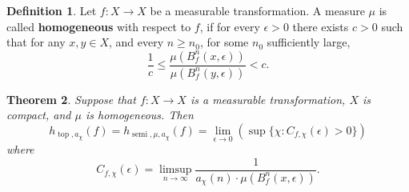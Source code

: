 \documentclass[oneside]{amsart}
\theoremstyle{plain}
\newtheorem{THM}{Theorem}[section]
\theoremstyle{definition}
\newtheorem{DEF}[THM]{Definition}
\newcommand{\<}{\langle}
\renewcommand{\>}{\rangle}
\newcommand{\e}{\epsilon}
\newcommand{\topo}{\operatorname{top}}
\renewcommand{\|}{|\!|} %
\newcommand{\semitop}{\operatorname{semi}} %
\begin{document}
\begin{DEF}
\label{def:homog}
Let $f \colon X \to X$ be a measurable transformation. A measure $\mu$ is called {\bf homogeneous} with respect to $f$, if for every $\e > 0$ there exists $c > 0$ such that for any $x,y \in X$, and every $n \geq n_0$, for some $n_0$ sufficiently large, 
\begin{equation*}
    \frac{1}{c} \le \frac{\mu(B_f^n(x,\e))}{\mu(B_f^n(y,\e))} < c.
\end{equation*}
\end{DEF}

\begin{THM}
\label{thm:homogmeasures}
    Suppose that $f \colon X \to X$ is a measurable transformation, $X$ is compact, and $\mu$ is homogeneous. Then 
    \begin{equation*}
         h_{\topo,a_\chi}(f) = h_{\semitop,\mu,a_\chi}(f) = \lim_{\e \to 0} \left(\sup \{ \chi : C_{f,\chi}(\e) > 0 \}\right)
    \end{equation*}
    where
    \begin{equation*}
     C_{f,\chi}(\e) = \limsup_{n\to\infty}\dfrac{1}{a_\chi(n) \cdot \mu(B_f^n(x,\e))}.
    \end{equation*}
\end{THM}
\end{document}
